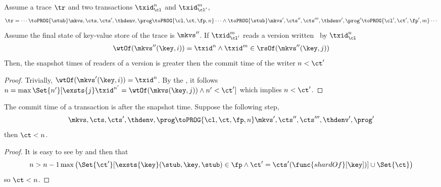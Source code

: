 \begin{lemma}
    \label{lem:clock-si-reader-greater-than-writer}
    Assume a trace \( \tr \) and two transactions \( \txid_{\cl}^n\) and \( \txid_{\cl'}^m \),
        \[
            \begin{array}{@{}l@{}}
                \tr = \cdots \toPROG{\stub} \mkvs,\cts,\cts',\thdenv, \prog \toPROG{\cl,\ct,\fp,n} \cdots \land
                \toPROG{\stub} \mkvs',\cts'',\cts''',\thdenv', \prog' \toPROG{\cl',\ct',\fp',m} \cdots
            \end{array}
        \]
    Assume the final state of key-value store of the trace is \( \mkvs'' \).
    If  \( \txid_{\cl'}^m \) reads a version written \ by \( \txid_{\cl}^n\)
    \[
        \begin{array}{@{}l@{}}
            \wtOf(\mkvs''(\key,i)) = \txid^n 
            \land \txid^m \in \rsOf(\mkvs''(\key,j))
        \end{array}
    \]
    Then, the snapshot times of readers of a version is greater then the commit time of the writer \( n < \ct' \)
\end{lemma}
\begin{proof}
    Trivially, \( \wtOf(\mkvs'(\key,i)) = \txid^n \).
    By the , it follows \( n  = \max\Set{n'}[\exsts{j} \txid^{n'} = \wtOf(\mkvs(\key, j)) \land n' < \ct'] \) which implies \( n < \ct' \).
\end{proof}


\begin{lemma}
    \label{lem:commit-after-snapshot-time}
    The commit time of a transaction is after the snapshot time.
    Suppose the following step,
    \[
        \mkvs,\cts,\cts',\thdenv, \prog \toPROG{\cl,\ct,\fp,n} \mkvs',\cts'',\cts''',\thdenv', \prog'
    \]
    then \( \ct < n \).
\end{lemma}
\begin{proof}
    It is easy to see by  and then  that 
    \[
        n > n - 1 \max\left( \Set{\ct'}[\exsts{\key} (\stub, \key, \stub) \in \fp \land \ct' = \cts'(\func{shardOf}[\key])] \cup \Set{\ct} \right)
    \]
    so \( \ct < n \).
\end{proof}



